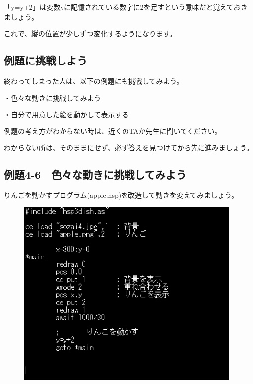 \begin{description}
    \item {}
    \item {}
    \item {}
\end{description}



「y=y+2」は変数yに記憶されている数字に2を足すという意味だと覚えておきましょう。

これで、縦の位置が少しずつ変化するようになります。
\newpage
\subsection{例題に挑戦しよう}


終わってしまった人は、以下の例題にも挑戦してみよう。

・色々な動きに挑戦してみよう

・自分で用意した絵を動かして表示する

例題の考え方がわからない時は、近くのTAか先生に聞いてください。

わからない所は、そのままにせず、必ず答えを見つけてから先に進みましょう。


\newpage
\subsection{例題4-6　色々な動きに挑戦してみよう}


\begin{description}
    \item {}
\end{description}

りんごを動かすプログラム(apple.hsp)を改造して動きを変えてみましょう。


\begin{figure}[H]
    \begin{center}
      \includegraphics[keepaspectratio,width=10.954cm,height=9.213cm]{text04-img/s_fallsrc.png}
    \end{center}
    \label{fig:prog_menu}
\end{figure}

